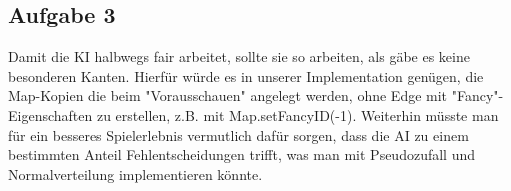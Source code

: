 \documentclass[a4paper]{article}
\begin{document}
	\subsection*{Aufgabe 3}
	Damit die KI halbwegs fair arbeitet, sollte sie so arbeiten, als gäbe es keine besonderen Kanten. Hierfür würde es in unserer Implementation genügen, die Map-Kopien die beim "Vorausschauen" angelegt werden, ohne Edge mit "Fancy"-Eigenschaften zu erstellen, z.B. mit Map.setFancyID(-1). Weiterhin müsste man für ein besseres Spielerlebnis vermutlich dafür sorgen, dass die AI zu einem bestimmten Anteil Fehlentscheidungen trifft, was man mit Pseudozufall und Normalverteilung implementieren könnte. 
\end{document}

